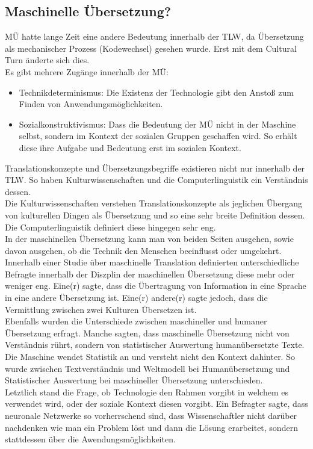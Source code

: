 \documentclass{article}
\begin{document}
	\subsection{Maschinelle Übersetzung?}
	MÜ hatte lange Zeit eine andere Bedeutung innerhalb der TLW, da Übersetzung als mechanischer Prozess (Kodewechsel) gesehen wurde. Erst mit dem Cultural Turn änderte sich dies. \\
	Es gibt mehrere Zugänge innerhalb der MÜ:
	\begin{itemize}
		\item{Technikdeterminismus: Die Existenz der Technologie gibt den Anstoß zum Finden von Anwendungsmöglichkeiten.}
		\item{Sozialkonstruktivismus: Dass die Bedeutung der MÜ nicht in der Maschine selbst, sondern im Kontext der sozialen Gruppen geschaffen wird. So erhält diese ihre Aufgabe und Bedeutung erst im sozialen Kontext.}
	\end{itemize}
	Translationskonzepte und Übersetzungsbegriffe existieren nicht nur innerhalb der TLW. So haben Kulturwissenschaften und die Computerlinguistik ein Verständnis dessen. \\
	Die Kulturwissenschaften verstehen Translationskonzepte als jeglichen Übergang von kulturellen Dingen als Übersetzung und so eine sehr breite Definition dessen. \\
	Die Computerlinguistik definiert diese hingegen sehr eng. \\
	In der maschinellen Übersetzung kann man von beiden Seiten ausgehen, sowie davon ausgehen, ob die Technik den Menschen beeinflusst oder umgekehrt. \\
	Innerhalb einer Studie über maschinelle Translation definierten unterschiedliche Befragte innerhalb der Diszplin der maschinellen Übersetzung diese mehr oder weniger eng. Eine(r) sagte, dass die Übertragung von Information in eine Sprache in eine andere Übersetzung ist. Eine(r) andere(r) sagte jedoch, dass die Vermittlung zwischen zwei Kulturen Übersetzen ist. \\
	Ebenfalls wurden die Unterschiede zwischen maschineller und humaner Übersetzung erfragt. Manche sagten, dass maschinelle Übersetzung nicht von Verständnis rührt, sondern von statistischer Auswertung humanübersetzte Texte. Die Maschine wendet Statistik an und versteht nicht den Kontext dahinter. So wurde zwischen Textverständnis und Weltmodell bei Humanübersetzung und Statistischer Auswertung bei maschineller Übersetzung unterschieden. \\
	Letztlich stand die Frage, ob Technologie den Rahmen vorgibt in welchem es verwendet wird, oder der soziale Kontext diesen vorgibt. Ein Befragter sagte, dass neuronale Netzwerke so vorherrschend sind, dass Wissenschaftler nicht darüber nachdenken wie man ein Problem löst und dann die Lösung erarbeitet, sondern stattdessen über die Awendungsmöglichkeiten. \\
\end{document}
